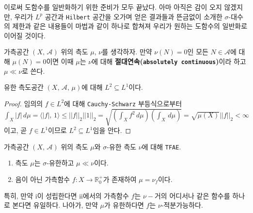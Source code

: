 이로써 도함수를 일반화하기 위한 준비가 모두 끝났다. 아마 아직은 감이 오지 않겠지만, 우리가 $L^p$ 공간과 \texttt{Hilbert} 공간을 오가며 얻은 결과들과 뜬금없이 소개한 $\sigma$-대수의 제한과 같은 내용들이 마법과 같이 하나로 합쳐져 우리가 원하는 도함수의 일반화로 이어질 것이다.

\begin{definition}
    가측공간 $(X,\,\mathcal{A})$ 위의 측도 $\mu,\,\nu$를 생각하자. 만약 $\nu(N)=0$인 모든 $N\in\mathcal{A}$에 대해 $\mu(N)=0$이면 이때 $\mu$는 $\nu$에 대해 \textbf{절대연속(\texttt{absolutely continuous})}이라 하고 $\mu\ll\nu$로 쓴다.
\end{definition}

\begin{lemma}
    유한 측도공간 $(X,\,\mathcal{A},\,\mu)$에 대해 $L^2\subseteq L^1$이다.
\end{lemma}

\begin{proof}
    임의의 $f\in L^2$에 대해 \texttt{Cauchy-Schwarz} 부등식으로부터 $\int_X|f|\,d\mu=\langle|f|,\,1\rangle\leq||f||_2||1||_2=\sqrt{(\int_Xf^2\,d\mu)(\int_X\,d\mu)}=\sqrt{\mu(X)}||f||_2<\infty$이고, 곧 $f\in L^1$이므로 $L^2\subseteq L^1$임을 안다.
\end{proof}

\begin{theorem}
    가측공간 $(X,\,\mathcal{A})$ 위의 측도 $\mu$와 $\sigma$-유한 측도 $\nu$에 대해 \texttt{TFAE}.
    \begin{enumerate}
        \item 측도 $\mu$는 $\sigma$-유한하고 $\mu\ll\nu$이다.
        \item 음이 아닌 가측함수 $f:X\to\mathbb{R}^+_0$가 존재하여 $\mu=\nu_f$이다.
    \end{enumerate}
    특히, 만약 i이 성립한다면 ii에서의 가측함수 $f$는 $\nu-$거의 어디서나 같은 함수를 하나로 본다면 유일하다. 나아가, 만약 $\mu$가 유한하다면 $f$는 $\nu$-적분가능하다.
\end{theorem}

